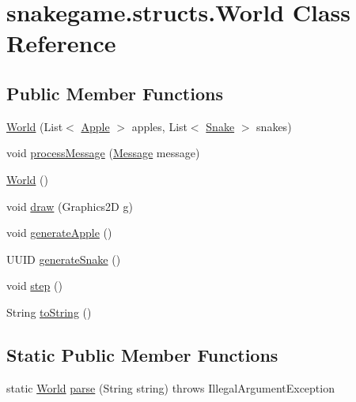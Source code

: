 \hypertarget{classsnakegame_1_1structs_1_1_world}{}\section{snakegame.\+structs.\+World Class Reference}
\label{classsnakegame_1_1structs_1_1_world}
\subsection*{Public Member Functions}
\begin{DoxyCompactItemize}
\item 
\mbox{\hyperlink{classsnakegame_1_1structs_1_1_world_a5ae70562a085bef9fe1f6c718fae1385}{World}} (List$<$ \mbox{\hyperlink{classsnakegame_1_1structs_1_1_apple}{Apple}} $>$ apples, List$<$ \mbox{\hyperlink{classsnakegame_1_1structs_1_1_snake}{Snake}} $>$ snakes)
\item 
void \mbox{\hyperlink{classsnakegame_1_1structs_1_1_world_aa60efdc485c049d8011fb6c50feead00}{process\+Message}} (\mbox{\hyperlink{classsnakegame_1_1server_1_1_message}{Message}} message)
\item 
\mbox{\hyperlink{classsnakegame_1_1structs_1_1_world_ae2e3d1b007bf6a7dc55fb38443719abb}{World}} ()
\item 
void \mbox{\hyperlink{classsnakegame_1_1structs_1_1_world_aca40cde5e48ac321fdf87d207c2b07bc}{draw}} (Graphics2D g)
\item 
void \mbox{\hyperlink{classsnakegame_1_1structs_1_1_world_a0ade5918df8724d3af19bea782932a96}{generate\+Apple}} ()
\item 
U\+U\+ID \mbox{\hyperlink{classsnakegame_1_1structs_1_1_world_a64c7e69961c14046814619a7365f8630}{generate\+Snake}} ()
\item 
void \mbox{\hyperlink{classsnakegame_1_1structs_1_1_world_a3da1e90d5d7e475e900171540123c9e3}{step}} ()
\item 
String \mbox{\hyperlink{classsnakegame_1_1structs_1_1_world_a4b6e33ad84c2ab6d5156acb1d32cdcff}{to\+String}} ()
\end{DoxyCompactItemize}
\subsection*{Static Public Member Functions}
\begin{DoxyCompactItemize}
\item 
static \mbox{\hyperlink{classsnakegame_1_1structs_1_1_world}{World}} \mbox{\hyperlink{classsnakegame_1_1structs_1_1_world_ab8c00c8a748680c55739b31c51d50af5}{parse}} (String string)  throws Illegal\+Argument\+Exception
\end{DoxyCompactItemize}


